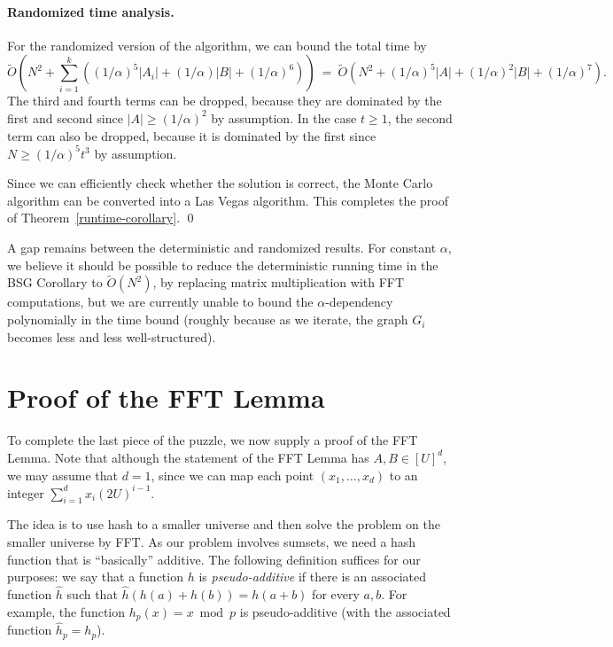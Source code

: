 \documentclass[11pt]{article}
\newcommand{\OO}{\widetilde{O}}
\begin{document}
{\paragraph{Randomized time analysis.}

For the randomized version of the algorithm, we can bound
the total time by $$\OO\left(N^2 + \sum_{i=1}^k ((1/\alpha)^5 |A_i| + (1/\alpha)|B| + (1/\alpha)^6)\right)\:=\: \OO(N^2 + (1/\alpha)^5 |A| + (1/\alpha)^2|B| + (1/\alpha)^7).$$
The third and fourth terms can be dropped, because they are
dominated by the first and second since $|A|\ge (1/\alpha)^2$ by assumption.
In the case $t\ge 1$, the second term can also be dropped,
because it is dominated by the first
since $N\ge (1/\alpha)^5 t^3$ by assumption.

Since we can efficiently check whether the solution is correct,
the Monte Carlo algorithm can
be converted into a Las Vegas algorithm.
This completes the proof of Theorem~\ref{runtime-corollary}.
\qed


\bigskip
A gap remains between the deterministic and randomized results.
For constant $\alpha$, we believe it should be possible
to reduce the deterministic running time in the BSG Corollary
to $\OO(N^2)$, by replacing
matrix multiplication with FFT computations, but we are currently
unable to bound the $\alpha$-dependency polynomially in the time
bound (roughly
because as we
iterate, the graph $G_i$ becomes less and less well-structured).


\section{Proof of the FFT Lemma}\label{sec-fft}

To complete the last piece of the puzzle, we now supply a proof of the FFT Lemma.
Note that although the statement of the FFT Lemma has $A,B\in [U]^d$,
we may assume that $d=1$, since we can map
each point $(x_1,\ldots,x_d)$ to an integer
$\sum_{i=1}^d x_i(2U)^{i-1}$.


The idea is to use hash to a smaller universe and
then solve the problem on the smaller universe by FFT\@.
As our problem involves sumsets,
we need a hash function that is ``basically'' additive.
The following definition suffices for our purposes: we say
that a function $h$ is \emph{pseudo-additive} if there
is an associated function $\hat{h}$ such that
$\hat{h}(h(a)+h(b)) = h(a+b)$ for every $a,b$.
For example, the function $h_p(x)= x\bmod{p}$ is pseudo-additive
(with the associated function $\hat{h}_p=h_p$).

}
\end{document}
